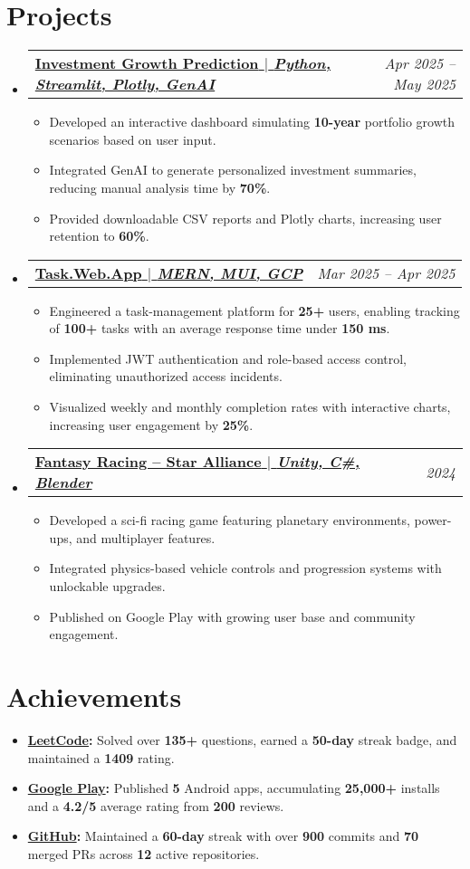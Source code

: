 \documentclass[letterpaper,11pt]{article}
\makeatletter
\newcommand{\resumeItem}[1]{
  \item\small{#1 \vspace{-2pt}}
}
\newcommand{\resumeProjectHeading}[2]{
  \item
  \begin{tabular*}{0.97\textwidth}{l@{\extracolsep{\fill}}r}
    \textbf{#1} & \textit{\small #2} \\
  \end{tabular*}\vspace{-7pt}
}
\newcommand{\resumeSubHeadingListStart}{\begin{itemize}[leftmargin=0.15in, label={}]}
\newcommand{\resumeSubHeadingListEnd}{\end{itemize}}
\newcommand{\resumeItemListStart}{\begin{itemize}}
\newcommand{\resumeItemListEnd}{\end{itemize}\vspace{-5pt}}
\makeatother
\begin{document}
\section{Projects}
\resumeSubHeadingListStart
  \resumeProjectHeading{\href{https://aiwrapper.streamlit.app/}{\small\textbf{Investment Growth Prediction} $|$ \emph{Python, Streamlit, Plotly, GenAI}}}{Apr 2025 -- May 2025}
  \resumeItemListStart
    \resumeItem{Developed an interactive dashboard simulating \textbf{10-year} portfolio growth scenarios based on user input.}
    \resumeItem{Integrated GenAI to generate personalized investment summaries, reducing manual analysis time by \textbf{70\%}.}
    \resumeItem{Provided downloadable CSV reports and Plotly charts, increasing user retention to \textbf{60\%}.}
  \resumeItemListEnd

  \resumeProjectHeading{\href{https://github.com/abhay-byte/task_management_tool}{\small\textbf{Task.Web.App} $|$ \emph{MERN, MUI, GCP}}}{Mar 2025 -- Apr 2025}
  \resumeItemListStart
    \resumeItem{Engineered a task-management platform for \textbf{25+} users, enabling tracking of \textbf{100+} tasks with an average response time under \textbf{150 ms}.}
    \resumeItem{Implemented JWT authentication and role-based access control, eliminating unauthorized access incidents.}
    \resumeItem{Visualized weekly and monthly completion rates with interactive charts, increasing user engagement by \textbf{25\%}.}
  \resumeItemListEnd

  \resumeProjectHeading{\href{https://play.google.com/store/apps/details?id=com.ivarnagames.fantasyracer}{\small\textbf{Fantasy Racing – Star Alliance} $|$ \emph{Unity, C\#, Blender}}}{2024}
  \resumeItemListStart
    \resumeItem{Developed a sci-fi racing game featuring planetary environments, power-ups, and multiplayer features.}
    \resumeItem{Integrated physics-based vehicle controls and progression systems with unlockable upgrades.}
    \resumeItem{Published on Google Play with growing user base and community engagement.}
  \resumeItemListEnd

\resumeSubHeadingListEnd

\section{Achievements}
\resumeSubHeadingListStart
  \resumeItem{\textbf{\href{https://leetcode.com/u/abhay-byte/}{LeetCode}:} Solved over \textbf{135+} questions, earned a \textbf{50-day} streak badge, and maintained a \textbf{1409} rating.}
  \resumeItem{\textbf{\href{https://play.google.com/store/apps/dev?id=8004929841101888920&hl=en_US&gl=US}{Google Play}:} Published \textbf{5} Android apps, accumulating \textbf{25,000+} installs and a \textbf{4.2/5} average rating from \textbf{200} reviews.}
  \resumeItem{\textbf{\href{https://github.com/abhay-byte/}{GitHub}:} Maintained a \textbf{60-day} streak with over \textbf{900} commits and \textbf{70} merged PRs across \textbf{12} active repositories.}
\resumeSubHeadingListEnd
\end{document}
